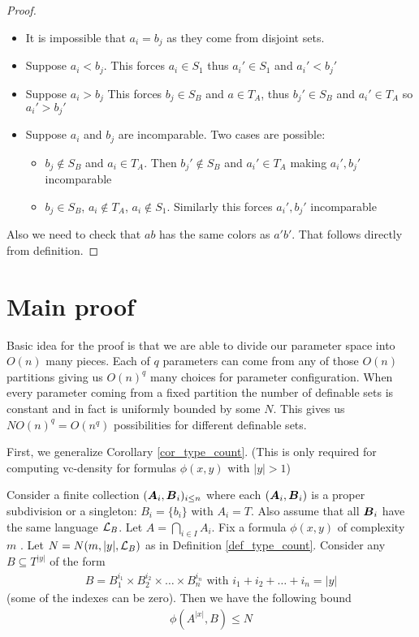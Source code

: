 \documentclass{amsart}
\DeclareMathOperator{\A}{\boldface A}
\DeclareMathOperator{\B}{\boldface B}
\begin{document}
\begin{proof}
	\begin{itemize}
		\item It is impossible that $a_i = b_j$ as they come from disjoint sets.
		\item Suppose $a_i < b_j$. This forces $a_i \in S_1$ thus $a_i' \in S_1$ and $a_i' < b_j'$ 
		\item Suppose $a_i > b_j$ This forces $b_j \in S_B$ and $a \in T_A$, thus $b_j' \in S_B$ and $a_i' \in T_A$ so $a_i' > b_j'$ 
		\item Suppose $a_i$ and $b_j$ are incomparable. Two cases are possible:
		\begin{itemize}
			\item $b_j \notin S_B$ and $a_i \in T_A$. Then $b_j' \notin S_B$ and $a_i' \in T_A$ making $a_i', b_j'$ incomparable
			\item $b_j \in S_B$, $a_i \notin T_A$, $a_i \notin S_1$. Similarly this forces $a_i', b_j'$ incomparable
		\end{itemize}
	\end{itemize}
	Also we need to check that $ab$ has the same colors as $a'b'$. That follows directly from definition.
\end{proof}

\section{Main proof}

Basic idea for the proof is that we are able to divide our parameter space into $O(n)$ many pieces. Each of $q$ parameters can come from any of those $O(n)$ partitions giving us $O(n)^q$ many choices for parameter configuration. When every parameter coming from a fixed partition the number of definable sets is constant and in fact is uniformly bounded by some $N$. This gives us $N O(n)^q = O(n^q)$ possibilities for different definable sets.

First, we generalize Corollary \ref{cor_type_count}. (This is only required for computing vc-density for formulas $\phi(x, y)$ with $|y| > 1$)

\begin{Lemma} \label{lm_partition_bound}
	Consider a finite collection $(\A_i, \B_i)_{i \leq n}$ where each $(\A_i, \B_i)$ is a proper subdivision or a singleton: $B_i = \{b_i\}$ with $A_i = T$. Also assume that all $\B_i$ have the same language $\mathcal L_B$. Let $A = \bigcap_{i \in I} A_i$. Fix a formula $\phi(x, y)$ of complexity $m$ . Let $N = N(m, |y|, \mathcal L_B)$ as in Definition \ref{def_type_count}. Consider any $B \subseteq T^{|y|}$ of the form
	\begin{align*}
		B = B_1^{i_1} \times B_2^{i_2} \times \ldots \times B_n^{i_n} \text { with } i_1 + i_2 + \ldots + i_n = |y|
	\end{align*}
	(some of the indexes can be zero). Then we have the following bound
	\begin{align*}
		\phi(A^{|x|}, B) \leq N
	\end{align*}
\end{Lemma}
\end{document}
